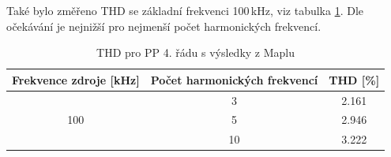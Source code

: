 \noindent Také bylo změřeno THD se základní frekvenci 100\,kHz, viz tabulka \ref{s:THD333}. Dle očekávání je nejnižší pro nejmenší počet harmonických frekvencí.
\begin{table}[h]
\centering
\renewcommand{\arraystretch}{1.15}
  \begin{tabular}{ | c | c | c |}
    \hline
    Frekvence zdroje [kHz] & Počet harmonických frekvencí & THD [\%] \\ \hline
	\multirow{3}{*}{100} & 3 & 2.161\\& 5 & 2.946 \\& 10 & 3.222 \\ \hline
  \end{tabular}
  \caption[THD pro PP 4. řádu (Maple)]{THD pro PP 4. řádu s výsledky z Maplu \label{s:THD333}}
\end{table}